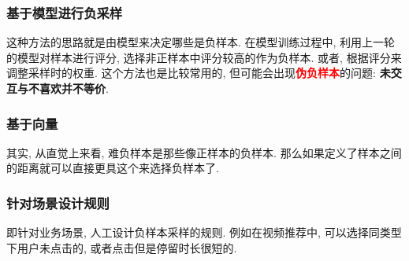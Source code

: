 \subsubsection{基于模型进行负采样}
这种方法的思路就是由模型来决定哪些是负样本. 在模型训练过程中, 利用上一轮的模型对样本进行评分, 选择非正样本中评分较高的作为负样本. 或者, 根据评分来调整采样时的权重. 这个方法也是比较常用的, 但可能会出现\textcolor{red}{\textbf{伪负样本}}的问题: \textbf{未交互与不喜欢并不等价}.

\subsubsection{基于向量}
其实, 从直觉上来看, 难负样本是那些像正样本的负样本. 那么如果定义了样本之间的距离就可以直接更具这个来选择负样本了.

\subsubsection{针对场景设计规则}
即针对业务场景, 人工设计负样本采样的规则. 例如在视频推荐中, 可以选择同类型下用户未点击的, 或者点击但是停留时长很短的.
